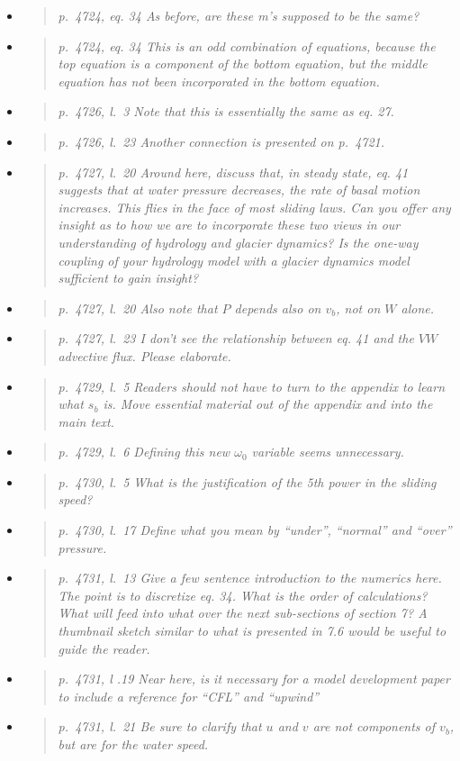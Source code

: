 \documentclass[11pt,reqno]{amsart}
\newcommand{\reply}[2]{
\medskip\medskip
\item  \begin{quote}
\emph{#1}
\end{quote}

\medskip
\noindent #2}
\begin{document}
\begin{itemize}
\reply{p.~4724, eq. 34 As before, are these m's supposed to be the same?}
{}

\reply{p.~4724, eq. 34 This is an odd combination of equations, because the top equation is a
component of the bottom equation, but the middle equation has not been incorporated
in the bottom equation.}
{}

\reply{p.~4726, l.~3 Note that this is essentially the same as eq. 27.}
{}

\reply{p.~4726, l.~23 Another connection is presented on p.~4721.}
{}

\reply{p.~4727, l.~20 Around here, discuss that, in steady state, eq. 41 suggests that at water
pressure decreases, the rate of basal motion increases. This flies in the face of most
sliding laws. Can you offer any insight as to how we are to incorporate these two views
in our understanding of hydrology and glacier dynamics? Is the one-way coupling of
your hydrology model with a glacier dynamics model sufficient to gain insight?}
{}

\reply{p.~4727, l.~20 Also note that $P$ depends also on $v_b$, not on $W$ alone.}
{}

\reply{p.~4727, l.~23 I don’t see the relationship between eq. 41 and the $VW$ advective flux.
Please elaborate.}
{}

\reply{p.~4729, l.~5 Readers should not have to turn to the appendix to learn what $s_b$ is.
Move essential material out of the appendix and into the main text.}
{}

\reply{p.~4729, l.~6 Defining this new $\omega_0$ variable seems unnecessary.}
{}

\reply{p.~4730, l.~5 What is the justification of the 5th power in the sliding speed?}
{}

\reply{p.~4730, l.~17 Define what you mean by “under”, “normal” and “over” pressure.}
{}

\reply{p.~4731, l.~13 Give a few sentence introduction to the numerics here. The point is to
discretize eq. 34. What is the order of calculations? What will feed into what over the
next sub-sections of section 7? A thumbnail sketch similar to what is presented in 7.6
would be useful to guide the reader.}
{}

\reply{p.~4731, l .19 Near here, is it necessary for a model development paper to include a
reference for “CFL” and “upwind”}
{}

\reply{p.~4731, l.~21 Be sure to clarify that $u$ and $v$ are not components of $v_b$, but are for the water speed.}
{}


\end{itemize}
\end{document}
